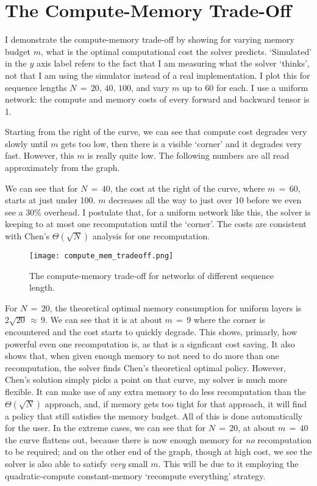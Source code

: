 \section{The Compute-Memory Trade-Off}

I demonstrate the compute-memory trade-off by showing for varying memory budget \(m\), what is the optimal computational cost the solver predicts.
`Simulated' in the \(y\) axis label refers to the fact that I am measuring what the solver `thinks', not that I am using the simulator instead of a real implementation.
I plot this for sequence lengths \(N\,=\, 20,\,40,\,100\), and vary \(m\) up to \(60\) for each.
I use a uniform network: the compute and memory costs of every forward and backward tensor is 1.

Starting from the right of the curve, we can see that compute cost degrades very slowly until \(m\) gets too low, then there is a visible `corner' and it degrades very fast.
However, this \(m\) is really quite low.
The following numbers are all read approximately from the graph.

We can see that for \(N\,=\,40\), the cost at the right of the curve, where \(m\,=\,60\), starts at just under 100.
\(m\) decreases all the way to just over 10 before we even see a 30\% overhead.
I postulate that, for a uniform network like this, the solver is keeping to at most one recomputation until the `corner'.
The costs are consistent with Chen's \(\Theta(\sqrt{N})\) analysis for one recomputation.

\begin{figure}[t]
    \centering
    \texttt{[image: compute\_mem\_tradeoff.png]}
    \caption{The compute-memory trade-off for networks of different sequence length.}
    \label{fig:4-cm-tradeoff}
\end{figure}

For \(N\,=\,20\), the theoretical optimal memory consumption for uniform layers is \(2\sqrt{20}\,\approx\,9\).
We can see that it is at about \(m\,=\,9\) where the corner is encountered and the cost starts to quickly degrade.
This shows, primarly, how powerful even one recomputation is, as that is a signficant cost saving.
It also shows that, when given enough memory to not need to do more than one recomputation, the solver finds Chen's theoretical optimal policy.
However, Chen's solution simply picks a point on that curve, my solver is much more flexible.
It can make use of any extra memory to do less recomputation than the \(\Theta(\sqrt{N})\) approach, and, if memory gets too tight for that approach, it will find a policy that still satisfies the memory budget.
All of this is done automatically for the user.
In the extreme cases, we can see that for \(N\,=\,20\), at about \(m\,=\,40\) the curve flattens out, because there is now enough memory for \textit{no} recomputation to be required;
and on the other end of the graph, though at high cost, we see the solver is also able to satisfy \textit{very} small \(m\).
This will be due to it employing the quadratic-compute constant-memory `recompute everything' strategy.

